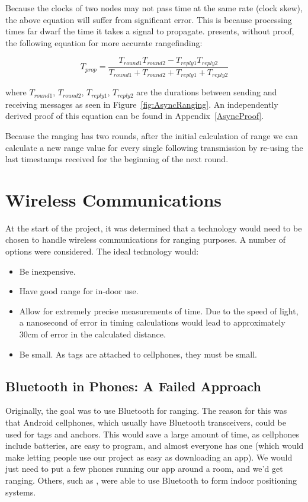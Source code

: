 Because the clocks of two nodes may not pass time at the same rate (clock skew), the above equation will suffer from significant error. This is because processing times far dwarf the time it takes a signal to propagate. \parencite{DW1000UserManual} presents, without proof, the following equation for more accurate rangefinding:

\[
	T_{prop} = \frac{T_{round1}  T_{round2} - T_{reply1} T_{reply2}}{T_{round1} + T_{round2} + T_{reply1} + T_{reply2}}
\]

where $T_{round1}$, $T_{round2}$, $T_{reply1}$, $T_{reply2}$ are the durations between sending and receiving messages as seen in Figure~\ref{fig:AsyncRanging}. An independently derived proof of this equation can be found in Appendix~\ref{AsyncProof}.

Because the ranging has two rounds, after the initial calculation of range we can calculate a new range value for every single following transmission by re-using the last timestamps received for the beginning of the next round.

\section{Wireless Communications}
At the start of the project, it was determined that a technology would need to be chosen to handle wireless communications for ranging purposes. A number of options were considered. The ideal technology would:
\begin{itemize}
	\item Be inexpensive.
	\item Have good range for in-door use.
	\item Allow for extremely precise measurements of time. Due to the speed of light, a nanosecond of error in timing calculations would lead to approximately 30cm of error in the calculated distance.
	\item Be small. As tags are attached to cellphones, they must be small.
\end{itemize}

\subsection{Bluetooth in Phones: A Failed Approach}
Originally, the goal was to use Bluetooth for ranging. The reason for this was that Android cellphones, which usually have Bluetooth transceivers, could be used for tags and anchors. This would save a large amount of time, as cellphones include batteries, are easy to program, and almost everyone has one (which would make letting people use our project as easy as downloading an app). We would just need to put a few phones running our app around a room, and we'd get ranging. Others, such as \parencite{BluetoothIndoor}, were able to use Bluetooth to form indoor positioning systems.

